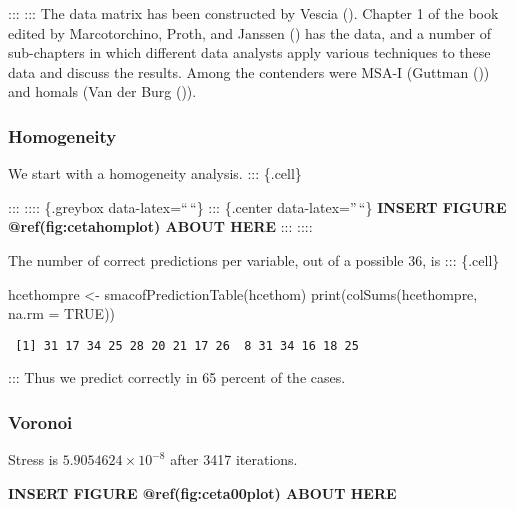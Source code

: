 \documentclass[
  12pt,
  letterpaper,
  DIV=11,
  numbers=noendperiod]{scrartcl}
\newenvironment{Shaded}{\begin{snugshade}}{\end{snugshade}}
\newcommand{\AttributeTok}[1]{\textcolor[rgb]{0.40,0.45,0.13}{#1}}
\newcommand{\ConstantTok}[1]{\textcolor[rgb]{0.56,0.35,0.01}{#1}}
\newcommand{\FunctionTok}[1]{\textcolor[rgb]{0.28,0.35,0.67}{#1}}
\newcommand{\NormalTok}[1]{\textcolor[rgb]{0.00,0.23,0.31}{#1}}
\newcommand{\OtherTok}[1]{\textcolor[rgb]{0.00,0.23,0.31}{#1}}
\begin{document}
::: ::: The data matrix has been constructed by Vescia
(). Chapter 1 of the book edited by
Marcotorchino, Proth, and Janssen
() has the data, and
a number of sub-chapters in which different data analysts apply various
techniques to these data and discuss the results. Among the contenders
were MSA-I (Guttman ()) and homals (Van
der Burg ()).

\subsubsection{Homogeneity}\label{homogeneity-1}

We start with a homogeneity analysis. ::: \{.cell\}

::: :::: \{.greybox data-latex=``\,``\} ::: \{.center
data-latex=''\,``\} \textbf{INSERT FIGURE @ref(fig:cetahomplot) ABOUT
HERE} ::: ::::

The number of correct predictions per variable, out of a possible 36, is
::: \{.cell\}

\begin{Shaded}
\begin{Highlighting}[]
\NormalTok{hcethompre }\OtherTok{\textless{}{-}} \FunctionTok{smacofPredictionTable}\NormalTok{(hcethom)}
\FunctionTok{print}\NormalTok{(}\FunctionTok{colSums}\NormalTok{(hcethompre, }\AttributeTok{na.rm =} \ConstantTok{TRUE}\NormalTok{))}
\end{Highlighting}
\end{Shaded}

\begin{verbatim}
 [1] 31 17 34 25 28 20 21 17 26  8 31 34 16 18 25
\end{verbatim}

::: Thus we predict correctly in 65 percent of the cases.

\subsubsection{Voronoi}\label{voronoi-1}

Stress is \ensuremath{5.9054624\times 10^{-8}} after 3417 iterations.

\begin{greybox}

\begin{center}
\textbf{INSERT FIGURE @ref(fig:ceta00plot) ABOUT HERE}

\end{center}

\end{greybox}
\end{document}
